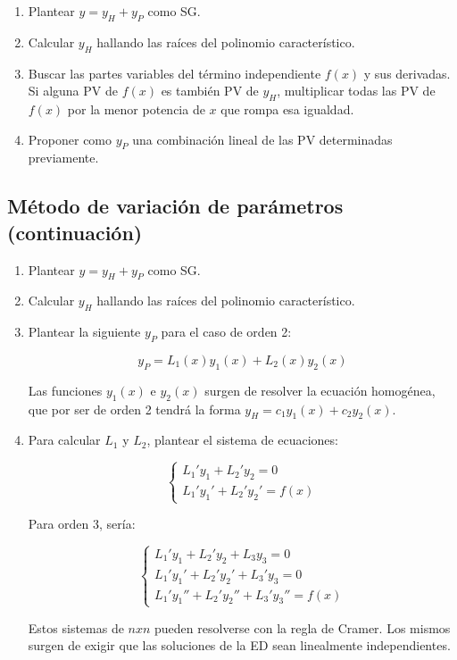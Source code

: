 \documentclass{article}
\begin{document}
\begin{enumerate}
\item Plantear $y = y_H + y_P$ como SG.
\item Calcular $y_H$ hallando las raíces del polinomio característico.
\item Buscar las partes variables del término independiente $f(x)$ y sus derivadas. Si alguna PV de $f(x)$ es también PV de $y_H$, multiplicar todas las PV de $f(x)$ por la menor potencia de $x$ que rompa esa igualdad.
\item Proponer como $y_P$ una combinación lineal de las PV determinadas previamente.
\end{enumerate}

\subsection{Método de variación de parámetros (continuación)}

\begin{enumerate}
\item Plantear $y = y_H + y_P$ como SG.
\item Calcular $y_H$ hallando las raíces del polinomio característico.
\item Plantear la siguiente $y_P$ para el caso de orden 2:

\begin{equation}
y_P = L_1(x) y_1(x) + L_2(x) y_2(x)
\end{equation}

Las funciones $y_1(x)$ e $y_2(x)$ surgen de resolver la ecuación homogénea, que por ser de orden 2 tendrá la forma $y_H = c_1 y_1(x) + c_2 y_2(x)$. 

\item Para calcular $L_1$ y $L_2$, plantear el sistema de ecuaciones:

\begin{equation}
\left\{
\begin{array}{ll}
L_1' y_1 + L_2' y_2 = 0 \\
L_1' y_1' + L_2' y_2' = f(x)
\end{array}
\right.
\end{equation}

Para orden 3, sería:

\begin{equation}
\left\{
\begin{array}{ll}
L_1' y_1 + L_2' y_2 + L_3 y_3 = 0 \\
L_1' y_1' + L_2' y_2' + L_3' y_3 = 0 \\
L_1' y_1'' + L_2' y_2'' + L_3' y_3'' = f(x)
\end{array}
\right.
\end{equation}

Estos sistemas de $nxn$ pueden resolverse con la regla de Cramer. Los mismos surgen de exigir que las soluciones de la ED sean linealmente independientes.

\end{enumerate}
\end{document}
